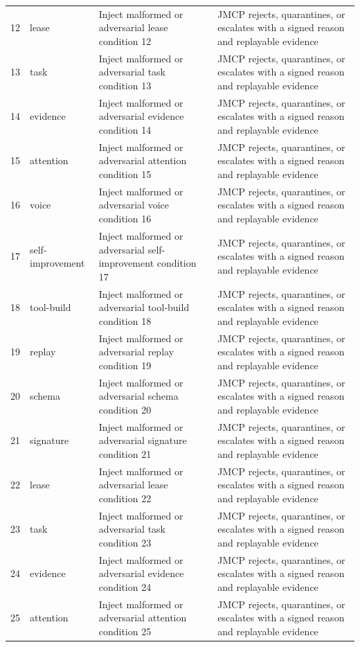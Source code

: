 \documentclass[10pt,journal,onecolumn]{IEEEtran}
\begin{document}
\begin{longtable}{P{0.05\textwidth} P{0.16\textwidth} P{0.38\textwidth} P{0.33\textwidth}}
12 & lease & Inject malformed or adversarial lease condition 12 & JMCP rejects, quarantines, or escalates with a signed reason and replayable evidence \\
13 & task & Inject malformed or adversarial task condition 13 & JMCP rejects, quarantines, or escalates with a signed reason and replayable evidence \\
14 & evidence & Inject malformed or adversarial evidence condition 14 & JMCP rejects, quarantines, or escalates with a signed reason and replayable evidence \\
15 & attention & Inject malformed or adversarial attention condition 15 & JMCP rejects, quarantines, or escalates with a signed reason and replayable evidence \\
16 & voice & Inject malformed or adversarial voice condition 16 & JMCP rejects, quarantines, or escalates with a signed reason and replayable evidence \\
17 & self-improvement & Inject malformed or adversarial self-improvement condition 17 & JMCP rejects, quarantines, or escalates with a signed reason and replayable evidence \\
18 & tool-build & Inject malformed or adversarial tool-build condition 18 & JMCP rejects, quarantines, or escalates with a signed reason and replayable evidence \\
19 & replay & Inject malformed or adversarial replay condition 19 & JMCP rejects, quarantines, or escalates with a signed reason and replayable evidence \\
20 & schema & Inject malformed or adversarial schema condition 20 & JMCP rejects, quarantines, or escalates with a signed reason and replayable evidence \\
21 & signature & Inject malformed or adversarial signature condition 21 & JMCP rejects, quarantines, or escalates with a signed reason and replayable evidence \\
22 & lease & Inject malformed or adversarial lease condition 22 & JMCP rejects, quarantines, or escalates with a signed reason and replayable evidence \\
23 & task & Inject malformed or adversarial task condition 23 & JMCP rejects, quarantines, or escalates with a signed reason and replayable evidence \\
24 & evidence & Inject malformed or adversarial evidence condition 24 & JMCP rejects, quarantines, or escalates with a signed reason and replayable evidence \\
25 & attention & Inject malformed or adversarial attention condition 25 & JMCP rejects, quarantines, or escalates with a signed reason and replayable evidence \\

\end{longtable}
\end{document}
